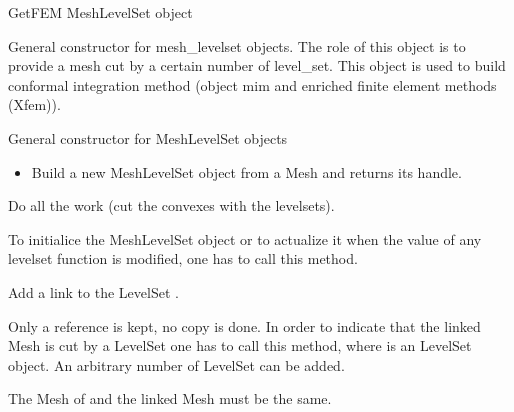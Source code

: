 \documentclass[a4paper,11pt,english]{sphinxmanual}
\begin{document}
\begin{fulllineitems}
\label{\detokenize{python/cmdref_MeshLevelSet:getfem.MeshLevelSet}}
GetFEM MeshLevelSet object

General constructor for mesh\_levelset objects. The role of this object is
to provide a mesh cut by a certain number of level\_set. This object is
used to build conformal integration method (object mim and enriched finite
element methods (Xfem)).

General constructor for MeshLevelSet objects
\begin{itemize}
\item {} 
Build a new MeshLevelSet object from a Mesh and returns its handle.

\end{itemize}

\begin{fulllineitems}
\label{\detokenize{python/cmdref_MeshLevelSet:getfem.MeshLevelSet.adapt}}
Do all the work (cut the convexes with the levelsets).

To initialice the MeshLevelSet object or to actualize it when the
value of any levelset function is modified, one has to call
this method.

\end{fulllineitems}


\begin{fulllineitems}
\label{\detokenize{python/cmdref_MeshLevelSet:getfem.MeshLevelSet.add}}
Add a link to the LevelSet .

Only a reference is kept, no copy is done. In order to indicate
that the linked Mesh is cut by a LevelSet one has to call this
method, where  is an LevelSet object. An arbitrary number of
LevelSet can be added.


The Mesh of  and the linked Mesh must be the same.


\end{fulllineitems}
\end{fulllineitems}
\end{document}
